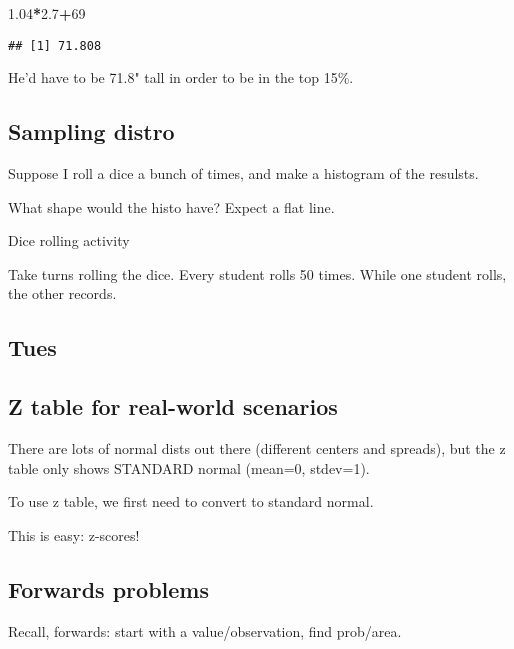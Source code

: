 \documentclass[]{article}
\newenvironment{Shaded}{\begin{snugshade}}{\end{snugshade}}
\newcommand{\DecValTok}[1]{\textcolor[rgb]{0.00,0.00,0.81}{#1}}
\newcommand{\FloatTok}[1]{\textcolor[rgb]{0.00,0.00,0.81}{#1}}
\newcommand{\OperatorTok}[1]{\textcolor[rgb]{0.81,0.36,0.00}{\textbf{#1}}}
\begin{document}
\begin{Shaded}
\begin{Highlighting}[]
\FloatTok{1.04}\OperatorTok{*}\FloatTok{2.7}\OperatorTok{+}\DecValTok{69}
\end{Highlighting}
\end{Shaded}

\begin{verbatim}
## [1] 71.808
\end{verbatim}

He'd have to be 71.8" tall in order to be in the top 15\%.

\hypertarget{sampling-distro}{%
\subsection{Sampling distro}\label{sampling-distro}}

Suppose I roll a dice a bunch of times, and make a histogram of the
resulsts.

What shape would the histo have? Expect a flat line.

Dice rolling activity

Take turns rolling the dice. Every student rolls 50 times. While one
student rolls, the other records.

\hypertarget{tues}{%
\subsection{Tues}\label{tues}}

\hypertarget{z-table-for-real-world-scenarios}{%
\subsection{Z table for real-world
scenarios}\label{z-table-for-real-world-scenarios}}

There are lots of normal dists out there (different centers and
spreads), but the z table only shows STANDARD normal (mean=0, stdev=1).

To use z table, we first need to convert to standard normal.

This is easy: z-scores!

\hypertarget{forwards-problems}{%
\subsection{Forwards problems}\label{forwards-problems}}

Recall, forwards: start with a value/observation, find prob/area.
\end{document}
